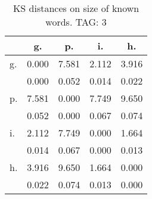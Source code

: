 \begin{table}[h!]
\begin{center}
\begin{tabular}{| l | c | c | c | c |}\hline
 & g. & p. & i. & h. \\\hline
g. & 0.000  & 7.581  & 2.112  & 3.916 \\\hline
 & 0.000  & 0.052  & 0.014  & 0.022 \\\hline
p. & 7.581  & 0.000  & 7.749  & 9.650 \\\hline
 & 0.052  & 0.000  & 0.067  & 0.074 \\\hline
i. & 2.112  & 7.749  & 0.000  & 1.664 \\\hline
 & 0.014  & 0.067  & 0.000  & 0.013 \\\hline
h. & 3.916  & 9.650  & 1.664  & 0.000 \\\hline
 & 0.022  & 0.074  & 0.013  & 0.000 \\\hline
\end{tabular}
\caption{KS distances on size of known words. TAG: 3}
\end{center}
\end{table}